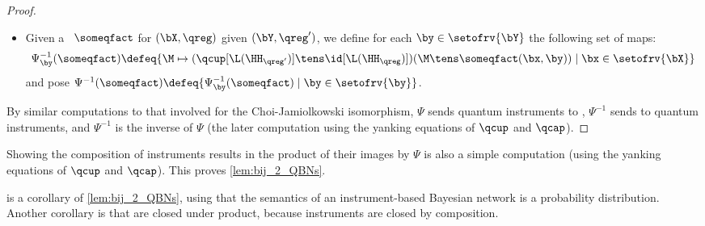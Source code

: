 \begin{proof}
\begin{itemize}
\item
Given a \qCPT\ $\someqfact$ for $(\bX,\qreg)$ given $(\bY, \qreg')$, we define for each $\by\in\setofrv{\bY}$ the following set of maps:
\begin{equation*}
\Psi^{-1}_{\by}(\someqfact)
\defeq
\{ \M \mapsto (\qcup[\L(\HH_{\qreg'})] \tens \id[\L(\HH_\qreg)]) (\M \tens \someqfact(\bx,\by)) \mid \bx\in\setofrv{\bX}\}
\end{equation*}
and pose $\Psi^{-1}(\someqfact) \defeq \{\Psi^{-1}_{\by}(\someqfact)\mid \by\in\setofrv{\by}\}$.
\end{itemize}
By similar computations to that involved for the Choi-Jamiolkowski isomorphism, $\Psi$ sends quantum instruments to \qCPTs, $\Psi^{-1}$ sends \qCPTs to quantum instruments, and $\Psi^{-1}$ is the inverse of $\Psi$ (the later computation using the yanking equations of $\qcup$ and $\qcap$).
\end{proof}

Showing the composition of instruments results in the product of their images by $\Psi$ is also a simple computation (using the yanking equations of $\qcup$ and $\qcap$).
This proves \cref{lem:bij_2_QBNs}.

\begin{remark}
 is a corollary of \cref{lem:bij_2_QBNs}, using that the semantics of an instrument-based Bayesian network is a probability distribution.
Another corollary is that \qCPTs are closed under product, because instruments are closed by composition.
\end{remark}

